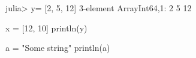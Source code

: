 

\begin{juliacode}
julia> y= [2, 5, 12]
3-element Array{Int64,1}:
  2
  5
 12

\end{juliacode}



\begin{juliacode}
x = [12, 10]
println(y)
\end{juliacode}
\begin{juliaout}
[2,5,12]
\end{juliaout}




\begin{juliaout}
[12,10]
\end{juliaout}







\begin{juliacode}
a = "Some string"
println(a)
\end{juliacode}




